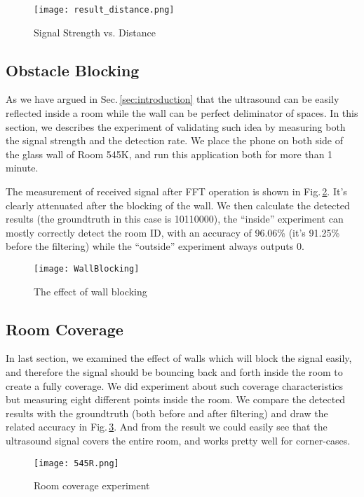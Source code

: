 \begin{figure}
  \centering
  \texttt{[image: result\_distance.png]}
  \caption{Signal Strength vs. Distance}
  \vspace{-0.3cm}
  \label{fig:strength}
\end{figure}

\subsection{Obstacle Blocking}
\label{sec:obstacle-blocking}
As we have argued in Sec.\,\ref{sec:introduction} that the ultrasound can be easily reflected inside a room while the wall can be perfect deliminator of spaces. In this section, we describes the experiment of validating such idea by measuring both the signal strength and the detection rate. We place the phone on both side of the glass wall of Room 545K, and run this application both for more than 1 minute. 

The measurement of received signal after FFT operation is shown in Fig.\,\ref{fig:wallblock}. It's clearly attenuated after the blocking of the wall. We then calculate the detected results (the groundtruth in this case is 10110000), the ``inside'' experiment can mostly correctly detect the room ID, with an accuracy of 96.06\% (it's 91.25\% before the filtering) while the ``outside'' experiment always outputs 0.

\begin{figure}
  \centering
  \texttt{[image: WallBlocking]}
  \vspace{-0.3cm}
  \caption{The effect of wall blocking}
  \label{fig:wallblock}
\end{figure}

\subsection{Room Coverage}
\label{sec:room-coverage}
In last section, we examined the effect of walls which will block the signal easily, and therefore the signal should be bouncing back and forth inside the room to create a fully coverage. We did experiment about such coverage characteristics but measuring eight different points inside the room. We compare the detected results with the groundtruth (both before and after filtering) and draw the related accuracy in Fig.\,\ref{fig:coverage}. And from the result we could easily see that the ultrasound signal covers the entire room, and works pretty well for corner-cases. 
\begin{figure}
  \centering
  \texttt{[image: 545R.png]}
  \vspace{-0.3cm}
  \caption{Room coverage experiment}
  \label{fig:coverage}
\end{figure}


